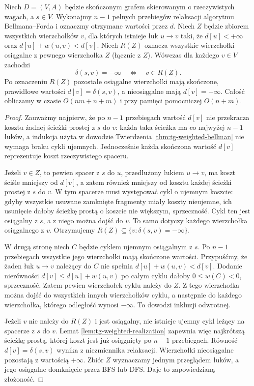 \begin{twierdzenie}
\label{thm:tg-weighted-bellman-negative-reach}
Niech $D=(V,A)$ będzie skończonym grafem
skierowanym o rzeczywistych wagach,
a $s\in V$. Wykonajmy $n-1$
pełnych przebiegów relaksacji
algorytmu Bellmana--Forda
i oznaczmy otrzymane wartości przez $d$.
Niech $Z$ będzie zbiorem wszystkich
wierzchołków $v$, dla których istnieje
łuk $u\to v$ taki, że
$d[u]<+\infty$ oraz
$d[u]+w(u,v)<d[v]$.
Niech $R(Z)$ oznacza wszystkie
wierzchołki osiągalne z pewnego
wierzchołka $Z$ (łącznie z $Z$).
Wówczas dla każdego $v\in V$
zachodzi
\[
\delta(s,v)=-\infty
\quad\Longleftrightarrow\quad
v\in R(Z).
\]
Po oznaczeniu $R(Z)$ pozostałe
osiągalne wierzchołki mają
skończone, prawidłowe wartości
$d[v]=\delta(s,v)$, a
nieosiągalne mają $d[v]=+\infty$.
Całość obliczamy w czasie
$O(nm+n+m)$ i przy pamięci
pomocniczej $O(n+m)$.
\end{twierdzenie}

\begin{proof}
Zauważmy najpierw, że po $n-1$
przebiegach wartość $d[v]$ nie
przekracza kosztu żadnej
ścieżki prostej z $s$ do $v$:
każda taka ścieżka ma co najwyżej
$n-1$ łuków, a indukcja użyta
w dowodzie Twierdzenia
\ref{thm:tg-weighted-bellman}
nie wymaga braku cykli ujemnych.
Jednocześnie każda skończona
wartość $d[v]$ reprezentuje koszt
rzeczywistego spaceru.

Jeżeli $v\in Z$, to pewien
spacer z $s$ do $u$, przedłużony
łukiem $u\to v$, ma koszt
ściśle mniejszy od $d[v]$,
a zatem również mniejszy od
kosztu każdej ścieżki prostej
z $s$ do $v$. W tym spacerze
musi występować cykl o ujemnym
koszcie: gdyby wszystkie
usuwane zamknięte fragmenty
miały koszty nieujemne,
ich usunięcie dałoby ścieżkę
prostą o koszcie nie większym,
sprzeczność. Cykl ten jest
osiągalny z $s$, a z niego
można dojść do $v$.
To samo dotyczy każdego
wierzchołka osiągalnego z $v$.
Otrzymujemy
$R(Z)\subseteq\{v:\delta(s,v)=-\infty\}$.

W drugą stronę niech $C$ będzie
cyklem ujemnym osiągalnym z $s$.
Po $n-1$ przebiegach wszystkie
jego wierzchołki mają skończone
wartości. Przypuśćmy, że żaden
łuk $u\to v$ należący do $C$
nie spełnia
$d[u]+w(u,v)<d[v]$.
Dodanie nierówności
$d[v]\leq d[u]+w(u,v)$
po całym cyklu dałoby
$0\leq w(C)<0$, sprzeczność.
Zatem pewien wierzchołek
cyklu należy do $Z$.
Z tego wierzchołka można
dojść do wszystkich innych
wierzchołków cyklu, a następnie
do każdego wierzchołka, którego
odległość wynosi $-\infty$.
To dowodzi inkluzji odwrotnej.

Jeżeli $v$ nie należy do
$R(Z)$ i jest osiągalny,
nie istnieje ujemny cykl
leżący na spacerze z $s$
do $v$. Lemat
\ref{lem:tg-weighted-realization}
zapewnia więc najkrótszą
ścieżkę prostą, której koszt
jest już osiągnięty po
$n-1$ przebiegach.
Równość $d[v]=\delta(s,v)$
wynika z niezmiennika
relaksacji. Wierzchołki
nieosiągalne pozostają z
wartością $+\infty$.
Zbiór $Z$ wyznaczamy jednym
przeglądem łuków, a jego
osiągalne domknięcie przez
BFS lub DFS. Daje to
zapowiedzianą złożoność.
\end{proof}

